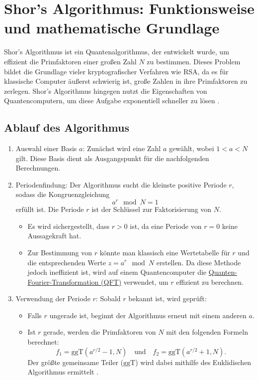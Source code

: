 \section{Shor’s Algorithmus: Funktionsweise und mathematische Grundlage}
\label{sec:shor}

Shor’s Algorithmus ist ein Quantenalgorithmus, der entwickelt wurde, um 
effizient die Primfaktoren einer großen Zahl $N$ zu bestimmen. Dieses 
Problem bildet die Grundlage vieler kryptografischer Verfahren wie RSA, 
da es für klassische Computer äußerst schwierig ist, große Zahlen in 
ihre Primfaktoren zu zerlegen. Shor’s Algorithmus hingegen nutzt die 
Eigenschaften von Quantencomputern, um diese Aufgabe exponentiell 
schneller zu lösen \cite{shor}.

\subsection{Ablauf des Algorithmus}

\begin{enumerate}
    \item Auswahl einer Basis $a$:
    Zunächst wird eine Zahl $a$ gewählt, wobei $1 < a < N$ gilt. Diese 
    Basis dient als Ausgangspunkt für die nachfolgenden Berechnungen.

    \item Periodenfindung: 
    Der Algorithmus sucht die kleinste positive Periode $r$, sodass die 
    Kongruenzgleichung  
    \[
    a^r \mod N = 1
    \]  
    erfüllt ist. Die Periode $r$ ist der Schlüssel zur Faktorisierung von $N$.  
    \begin{itemize}
        \item Es wird sichergestellt, dass $r > 0$ ist, da eine Periode von 
        $r = 0$ keine Aussagekraft hat.
        \item Zur Bestimmung von $r$ könnte man klassisch eine Wertetabelle 
        für $r$ und die entsprechenden Werte $z = a^r \mod N$ erstellen. Da 
        diese Methode jedoch ineffizient ist, wird auf einem Quantencomputer 
        die \hyperref[sec:QFT]{Quanten-Fourier-Transformation (QFT)} verwendet, um $r$ effizient 
        zu berechnen.
    \end{itemize}

    \item Verwendung der Periode $r$:
    Sobald $r$ bekannt ist, wird geprüft:  
    \begin{itemize}
        \item Falls $r$ ungerade ist, beginnt der Algorithmus erneut mit 
        einem anderen $a$.
        \item Ist $r$ gerade, werden die Primfaktoren von $N$ mit den 
        folgenden Formeln berechnet:  
        \[
        f_1 = \text{ggT}\left(a^{r/2} - 1, N\right) \quad \text{und} \quad f_2 = \text{ggT}\left(a^{r/2} + 1, N\right).
        \]  
        Der größte gemeinsame Teiler ($\text{ggT}$) wird dabei mithilfe 
        des Euklidischen Algorithmus ermittelt \cite{shor_klassisch} \cite{shor_klassisch2}.
    \end{itemize}
\end{enumerate}



